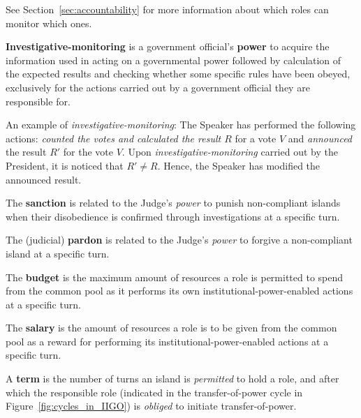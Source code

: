 See Section~\ref{sec:accountability} for more information about which roles can monitor which ones.


\begin{definition}
\textbf{Investigative-monitoring} is a government official's \textbf{power} to acquire the information used in acting on a governmental power followed by calculation of the expected results and checking whether some specific rules have been obeyed, exclusively for the actions carried out by a government official they are responsible for.
\end{definition}

An example of \emph{investigative-monitoring}: The Speaker has performed the following actions: \emph{counted the votes and calculated the result $R$} for a vote $V$ and \emph{announced} the result $R'$ for the vote $V$. Upon \emph{investigative-monitoring} carried out by the President, it is noticed that $R' \neq R$. Hence, the Speaker has modified the announced result.


\begin{definition}
The \textbf{sanction} is related to the Judge's \emph{power} to punish non-compliant islands when their disobedience is confirmed through investigations at a specific turn.
\end{definition}


\begin{definition}
The (judicial) \textbf{pardon} is related to the Judge's \emph{power} to forgive a non-compliant island at a specific turn.
\end{definition}

\begin{definition}
The \textbf{budget} is the maximum amount of resources a role is permitted to spend from the common pool as it performs its own institutional-power-enabled actions at a specific turn.
\end{definition}


\begin{definition}
The \textbf{salary} is the amount of resources a role is to be given from the common pool as a reward for performing its institutional-power-enabled actions at a specific turn.
\end{definition}

\begin{definition} \label{def:term}
A \textbf{term} is the number of turns an island is \emph{permitted} to hold a role, and after which the responsible role (indicated in the transfer-of-power cycle in Figure~\ref{fig:cycles_in_IIGO}) is \emph{obliged} to initiate transfer-of-power.
\end{definition}

